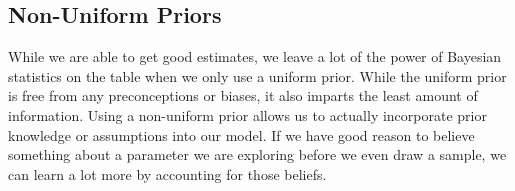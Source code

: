 \subsection*{Non-Uniform Priors}
While we are able to get good estimates, we leave a lot of the power of Bayesian statistics on the table when we only use a uniform prior.
While the uniform prior is free from any preconceptions or biases, it also imparts the least amount of information.
Using a non-uniform prior allows us to actually incorporate prior knowledge or assumptions into our model.
If we have good reason to believe something about a parameter we are exploring before we even draw a sample, we can learn a lot more by accounting for those beliefs.

\begin{comment}
\subsection*{Updates}
Another important tool that is gained in using Bayesian methods is the Bayesian update.
This method is simple but brings important advantages.
The method of the Bayesian update is simply taking the posterior that has already been calculated, and using that as a prior in the next stage.

This method allows us to refine our guesses over time.
We may be in a situation where we are given a limited initial sample, and an estimate is required before a larger sample can be taken.
In these cases, we can compute the posterior given the first sample, then use that posterior as the prior when we receive our next sample.
This allow us to continually improve the confidence in our estimates and distribute that computation over a long period of time.
\end{comment}

